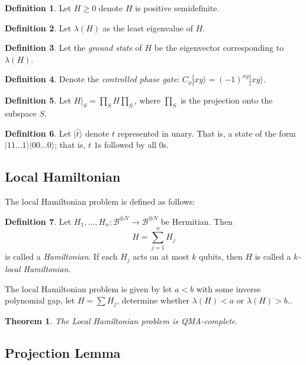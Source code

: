 \documentclass{article}
\newtheorem{theorem}{Theorem}[section]
\theoremstyle{definition}
\newtheorem{definition}{Definition}[section]
\begin{document}
\begin{definition}
	Let $H\geq0$ denote $H$ is positive semidefinite.
\end{definition}

\begin{definition}
	Let $\lambda(H)$ as the least eigenvalue of $H$.
\end{definition}

\begin{definition}
	Let the \emph{ground state} of $H$ be the eigenvector corresponding to $\lambda(H)$.
\end{definition}

\begin{definition}
	Denote the \emph{controlled phase gate}: $C_\phi|xy\rangle=(-1)^{xy}|xy\rangle$.
\end{definition}

\begin{definition}
	Let $H\big|_S=\prod_SH\prod_S$, where $\prod_S$ is the projection onto the subspace $S$.
\end{definition}

\begin{definition}
	Let $|\widehat{t}\rangle$ denote $t$ represented in unary. That is, a state of the form $|11\ldots1\rangle |00\ldots0\rangle$; that is, $t$ $1$s followed by all $0$s.
\end{definition}

\subsection{Local Hamiltonian}

The local Hamiltonian problem is defined as follows:

\begin{definition}
	Let $H_1, \ldots, H_n:\mathcal{B}^{\otimes N}\rightarrow\mathcal{B}^{\otimes N}$ be Hermitian. Then $$H=\sum_{j=1}^nH_j$$ is called a \emph{Hamiltonian}.
	If each $H_j$ acts on at most $k$ qubits, then $H$ is called a \emph{$k$-local Hamiltonian}.
\end{definition}

The local Hamiltonian problem is given by let $a<b$ with some inverse polynomial gap, let $H=\sum H_j$, determine whether $\lambda(H)<a$ or $\lambda(H)>b$..

\begin{theorem}
	The Local Hamiltonian problem is QMA-complete.
\end{theorem}

\subsection{Projection Lemma}
\end{document}
